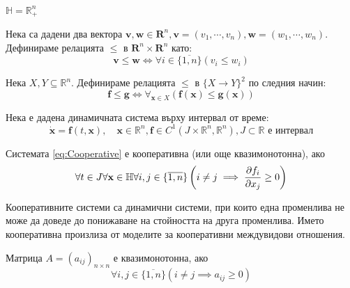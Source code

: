 \begin{definition}
  $\mathbb{H} = \mathbb{R}_{+}^n$
\end{definition}

\begin{definition}
  Нека са дадени два вектора $\mathbf{v}, \mathbf{w} \in \mathbf{R}^n, \mathbf{v}=(v_1, \cdots, v_n), \mathbf{w}=(w_1, \cdots, w_n)$. Дефинираме релацията $\leq$ в $\mathbf{R}^n \times \mathbf{R}^n$ като:
  \begin{equation*}
    \mathbf{v} \leq \mathbf{w} \iff \forall{i \in \{\overline{1,n}\}}(v_i \leq w_i)
    \end{equation*}
    \end{definition}
    
    \begin{definition}
    Нека $X, Y \subseteq \mathbb{R}^n$. Дефинираме релацията $\leq$ в $\{X \rightarrow Y\}^2$ по следния начин:
    \begin{equation*}
    \mathbf{f} \leq \mathbf{g} \iff \forall_{\mathbf{x} \in X} (\mathbf{f}(\mathbf{x}) \leq \mathbf{g}(\mathbf{x}))
  \end{equation*}
\end{definition}

Нека е дадена динамичната система върху интервал от време:
\begin{equation}
  \label{eq:Cooperative}
  \dot{\mathbf{x}} = \mathbf{f}(t, \mathbf{x}),  \quad \mathbf{x} \in \mathbb{R}^n, \mathbf{f} \in C^1(J \times \mathbb{R}^n, \mathbb{R}^n), J \subset \mathbb{R} \text{ е интервал}
\end{equation}

\begin{definition}
  \label{def:Cooperative}
  Системата \eqref{eq:Cooperative} е кооперативна (или още квазимонотонна), ако
  \begin{equation}
    \forall{t \in J}\forall{\mathbf{x} \in \mathbb{H}}\forall{i,j \in \{\overline{1,n}\}}\left(i \neq j \implies \pdv{f_i}{x_j}(t, \mathbf{x}) \geq 0\right)
  \end{equation}
\end{definition}
Кооперативните системи са динамични системи, при които една променлива не може да доведе до понижаване на стойността на друга променлива. Името кооперативна произлиза от моделите за кооперативни междувидови отношения.

\begin{definition}
  Матрица $A=(a_{ij})_{n \times n}$ е квазимонотонна, ако
  \begin{equation*}
    \forall{i,j \in \{\overline{1,n}\}} \left(i \neq j \implies a_{ij} \geq 0\right)
  \end{equation*}
\end{definition}

